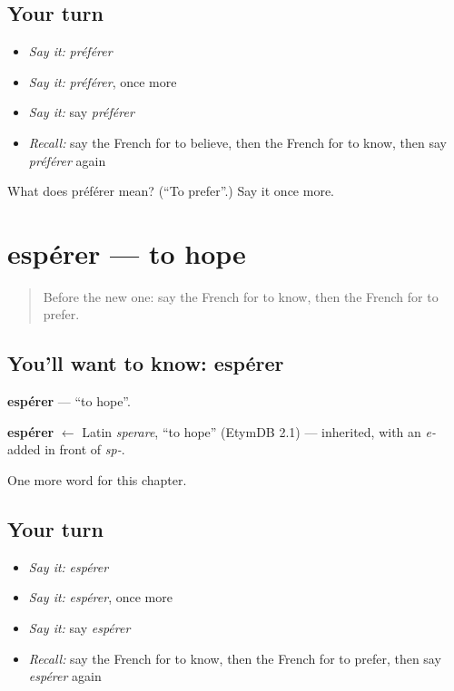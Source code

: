 \subsection*{Your turn}
\begin{itemize}
\raggedright
  \item \emph{Say it:} \emph{préférer}
  \item \emph{Say it:} \emph{préférer}, once more
  \item \emph{Say it:} say \emph{préférer}
  \item \emph{Recall:} say the French for to believe, then the French for to know, then say \emph{préférer} again
\end{itemize}

\begin{tcolorbox}[breakable,colback=teal!4,colframe=teal!35!black,title={Before you move on}]
What does préférer mean? (\textquotedblleft{}To prefer\textquotedblright{}.) Say it once more.
\end{tcolorbox}
\section[espérer]{espérer — to hope}

\label{lesson:FR-C138-esperer}



\begin{quote}
Before the new one: say the French for to know, then the French for to prefer.
\end{quote}

\subsection*{You'll want to know: espérer}
\textbf{espérer} — \textquotedblleft{}to hope\textquotedblright{}.

\begin{cousinweb}
\textbf{espérer} $\leftarrow$ Latin \emph{sperare}, \textquotedblleft{}to hope\textquotedblright{} (EtymDB 2.1) — inherited, with an \emph{e-} added in front of \emph{sp-}.
\end{cousinweb}

\begin{grammarlens}[title={What you've built}]
One more word for this chapter.
\end{grammarlens}

\subsection*{Your turn}
\begin{itemize}
\raggedright
  \item \emph{Say it:} \emph{espérer}
  \item \emph{Say it:} \emph{espérer}, once more
  \item \emph{Say it:} say \emph{espérer}
  \item \emph{Recall:} say the French for to know, then the French for to prefer, then say \emph{espérer} again
\end{itemize}

